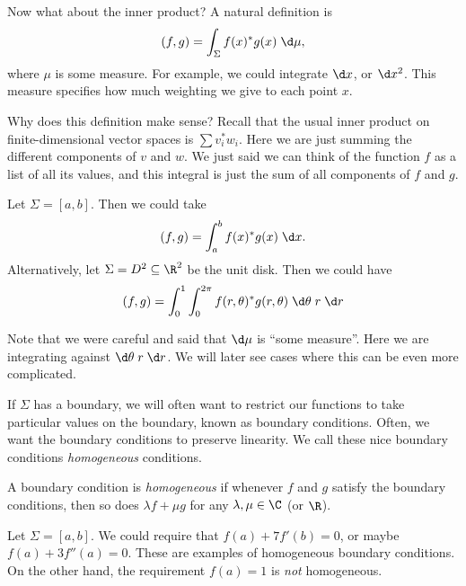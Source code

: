 \documentclass[a4paper]{article}
\begin{document}
Now what about the inner product? A natural definition is
\[
  (f, g) = \int_{\Sigma} f(x)^* g(x) \;\d \mu,
\]
where $\mu$ is some measure. For example, we could integrate $\d x$, or $\d x^2$. This measure specifies how much weighting we give to each point $x$.

Why does this definition make sense? Recall that the usual inner product on finite-dimensional vector spaces is $\sum v_i^* w_i$. Here we are just summing the different components of $v$ and $w$. We just said we can think of the function $f$ as a list of all its values, and this integral is just the sum of all components of $f$ and $g$.

\begin{eg}
  Let $\Sigma = [a, b]$. Then we could take
  \[
    (f, g) = \int_a^b f(x)^* g(x)\;\d x.
  \]
  Alternatively, let $\Sigma = D^2 \subseteq \R^2$ be the unit disk. Then we could have
  \[
    (f, g) = \int_0^1 \int_0^{2\pi}f(r, \theta)^* g(r, \theta)\;\d \theta\; r\;\d r
  \]
\end{eg}
Note that we were careful and said that $\d \mu$ is ``some measure''. Here we are integrating against $\d\theta\;r\;\d r$. We will later see cases where this can be even more complicated.

If $\Sigma$ has a boundary, we will often want to restrict our functions to take particular values on the boundary, known as boundary conditions. Often, we want the boundary conditions to preserve linearity. We call these nice boundary conditions \emph{homogeneous} conditions.

\begin{defi}
  A boundary condition is \emph{homogeneous} if whenever $f$ and $g$ satisfy the boundary conditions, then so does $\lambda f + \mu g$ for any $\lambda, \mu \in \C$ (or $\R$).
\end{defi}
\begin{eg}
  Let $\Sigma = [a, b]$. We could require that $f(a) + 7 f'(b) = 0$, or maybe $f(a) + 3 f''(a) = 0$. These are examples of homogeneous boundary conditions. On the other hand, the requirement $f(a) = 1$ is \emph{not} homogeneous.
\end{eg}
\end{document}

